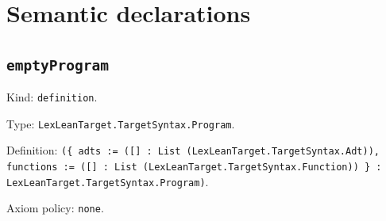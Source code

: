 \documentclass[11pt]{article}
\begin{document}
\section*{Semantic declarations}
\subsection*{\texttt{emptyProgram}}
\noindent Kind: \texttt{definition}.\par
\noindent Type: \texttt{LexLeanTarget.TargetSyntax.Program}.\par
\noindent Definition: \texttt{(\{ adts := ([] : List (LexLeanTarget.TargetSyntax.Adt)), functions := ([] : List (LexLeanTarget.TargetSyntax.Function)) \} : LexLeanTarget.TargetSyntax.Program)}.\par
\noindent Axiom policy: \texttt{none}.\par
\end{document}
